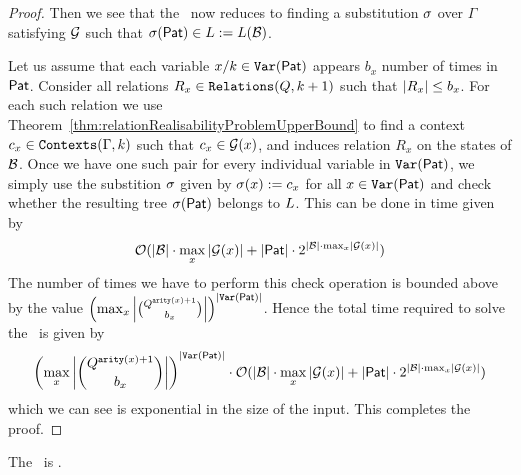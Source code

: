 \begin{proof}
    Then we see that the \atomicTypecheckingProblemFull\ now reduces to finding a substitution $\sigma$ over $\Gamma$ satisfying $\mathcal{G}$ such that $\sigma(\mathsf{Pat}) \in L := L(\mathcal{B})$.

    Let us assume that each variable $x/k \in \texttt{Var}(\mathsf{Pat})$ appears $b_x$ number of times in $\mathsf{Pat}$. Consider all relations $R_x \in \texttt{Relations}(Q, k+1)$ such that $\left\lvert R_x \right\rvert \leq b_x$. For each such relation we use Theorem~\ref{thm:relationRealisabilityProblemUpperBound} to find a context $c_x \in \texttt{Contexts}(\Gamma, k)$ such that $c_x \in \mathcal{G}(x)$, and induces relation $R_x$ on the states of $\mathcal{B}$. Once we have one such pair for every individual variable in $\texttt{Var}(\mathsf{Pat})$, we simply use the substition $\sigma$ given by $\sigma(x) := c_x$ for all $x \in \texttt{Var}(\mathsf{Pat})$ and check whether the resulting tree $\sigma(\mathsf{Pat})$ belongs to $L$. This can be done in time given by
    \[ \mathcal{O}( \left\lvert \mathcal{B} \right\rvert \cdot \max_x \left\lvert \mathcal{G}(x) \right\rvert + \left\lvert \mathsf{Pat} \right\rvert \cdot 2^{\left\lvert \mathcal{B} \right\rvert \cdot \max_x \left\lvert \mathcal{G}(x) \right\rvert} ) \]
    The number of times we have to perform this check operation is bounded above by the value $\left( \max_x \left\lvert \binom{Q^{\texttt{arity}(x)+1}}{b_x} \right\rvert \right)^{\left\lvert \texttt{Var}(\mathsf{Pat}) \right\rvert}$. Hence the total time required to solve the \atomicTypecheckingProblemFull\ is given by
    \[ \left( \max_x \left\lvert \binom{Q^{\texttt{arity}(x)+1}}{b_x} \right\rvert \right)^{\left\lvert \texttt{Var}(\mathsf{Pat}) \right\rvert} \cdot \mathcal{O}( \left\lvert \mathcal{B} \right\rvert \cdot \max_x \left\lvert \mathcal{G}(x) \right\rvert + \left\lvert \mathsf{Pat} \right\rvert \cdot 2^{\left\lvert \mathcal{B} \right\rvert \cdot \max_x \left\lvert \mathcal{G}(x) \right\rvert} ) \]
    which we can see is exponential in the size of the input. This completes the proof.
\end{proof}

\begin{theorem}
    The \atomicTypecheckingProblemFull\ is \expth.
\end{theorem}

